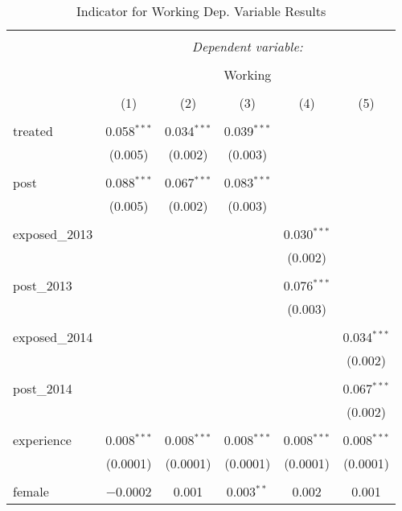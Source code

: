 
\begin{table}[!htbp] \centering 
  \caption{Indicator for Working Dep. Variable Results} 
  \label{} 
\begin{tabular}{@{\extracolsep{5pt}}lccccc} 
\\[-1.8ex]\hline 
\hline \\[-1.8ex] 
 & \multicolumn{5}{c}{\textit{Dependent variable:}} \\ 
\cline{2-6} 
\\[-1.8ex] & \multicolumn{5}{c}{Working} \\ 
\\[-1.8ex] & (1) & (2) & (3) & (4) & (5)\\ 
\hline \\[-1.8ex] 
 treated & 0.058$^{***}$ & 0.034$^{***}$ & 0.039$^{***}$ &  &  \\ 
  & (0.005) & (0.002) & (0.003) &  &  \\ 
  & & & & & \\ 
 post & 0.088$^{***}$ & 0.067$^{***}$ & 0.083$^{***}$ &  &  \\ 
  & (0.005) & (0.002) & (0.003) &  &  \\ 
  & & & & & \\ 
 exposed\_2013 &  &  &  & 0.030$^{***}$ &  \\ 
  &  &  &  & (0.002) &  \\ 
  & & & & & \\ 
 post\_2013 &  &  &  & 0.076$^{***}$ &  \\ 
  &  &  &  & (0.003) &  \\ 
  & & & & & \\ 
 exposed\_2014 &  &  &  &  & 0.034$^{***}$ \\ 
  &  &  &  &  & (0.002) \\ 
  & & & & & \\ 
 post\_2014 &  &  &  &  & 0.067$^{***}$ \\ 
  &  &  &  &  & (0.002) \\ 
  & & & & & \\ 
 experience & 0.008$^{***}$ & 0.008$^{***}$ & 0.008$^{***}$ & 0.008$^{***}$ & 0.008$^{***}$ \\ 
  & (0.0001) & (0.0001) & (0.0001) & (0.0001) & (0.0001) \\ 
  & & & & & \\ 
 female & $-$0.0002 & 0.001 & 0.003$^{**}$ & 0.002 & 0.001 \\ 

\end{tabular}
\end{table}
